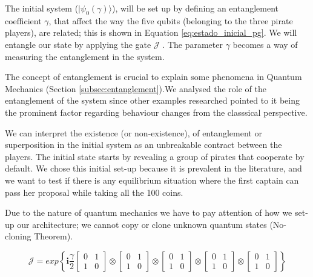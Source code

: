 The initial system ($\vert \psi_{0}(\gamma) \rangle$), will be set up by defining an entanglement coefficient $\gamma$, that affect the way the five qubits (belonging to the three pirate players), are related; this is shown in Equation \ref{eq:estado_inicial_pg}. 
We will entangle our state by applying the gate $\mathcal{J}$ \cite{Letters2002}. The parameter $\gamma$ becomes a way of measuring the entanglement in the system\cite{Eisert2008}. 

The concept of entanglement is crucial to explain some phenomena in Quantum Mechanics (Section \ref{subsec:entanglement}).We analysed the role of the entanglement of the system since other examples researched pointed to it being the prominent factor regarding behaviour changes from the classsical perspective\cite{Fra2011a}\cite{Fra2011}\cite{Letters2002}\cite{Khan2011}\cite{Ricketts2006}. 

We can interpret the existence (or non-existence), of entanglement or superposition in the initial system as an unbreakable contract between the players\cite{Piotrowski}. The initial state starts by revealing a group of pirates that cooperate by default. We chose this initial set-up because it is prevalent in the literature\cite{Eisert2008}\cite{Fra2011a}\cite{Fra2011}\cite{Letters2002}, and we want to test if there is any equilibrium situation where the first captain can pass her proposal while taking all the 100 coins. 



Due to the nature of quantum mechanics we have to pay attention of how we set-up our architecture; we cannot copy or clone unknown quantum states (No-cloning Theorem)\cite{Rieffel2011}. 



\begin{equation}
\mathcal{J}=exp\left\{\mathbf{i}\frac{\gamma}{2}\left[\begin{array}{cc}
0 & 1\\
1 & 0
\end{array}\right]\otimes\left[\begin{array}{cc}
0 & 1\\
1 & 0
\end{array}\right]\otimes\left[\begin{array}{cc}
0 & 1\\
1 & 0
\end{array}\right]\otimes\left[\begin{array}{cc}
0 & 1\\
1 & 0
\end{array}\right]
\otimes\left[\begin{array}{cc}
0 & 1\\
1 & 0
\end{array}\right]
\right\}
\label{eq:matrix_exponencial_esoterica}
\end{equation} 

